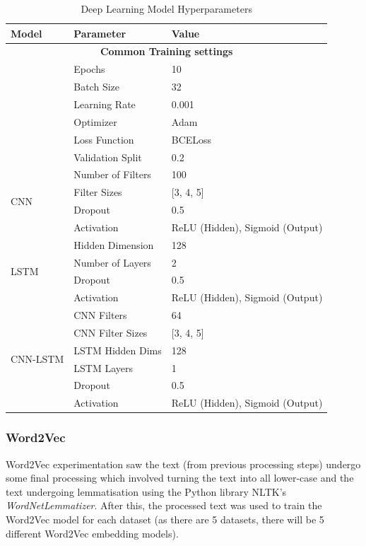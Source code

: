\documentclass[stu,12pt,floatsintext,donotrepeattitle]{apa7}
\begin{document}
\begin{table}[ht]
    \centering
    \caption{Deep Learning Model Hyperparameters}
    \label{tab:dl_model_params}
    \begin{tabular}{l l l}
        \hline
        \textbf{Model} & \textbf{Parameter} & \textbf{Value} \\
        \hline
        \multicolumn{3}{c}{\textbf{Common Training settings}} \\
        & Epochs & 10 \\
        & Batch Size & 32 \\
        & Learning Rate & 0.001 \\
        & Optimizer & Adam \\
        & Loss Function & BCELoss \\
        & Validation Split & 0.2 \\
        \hline
        \multirow{4}{*}{CNN} & Number of Filters & 100 \\
        & Filter Sizes & [3, 4, 5] \\
        & Dropout & 0.5 \\
        & Activation & ReLU (Hidden), Sigmoid (Output) \\
        \hline
        \multirow{4}{*}{LSTM} & Hidden Dimension & 128 \\
        & Number of Layers & 2 \\
        & Dropout & 0.5 \\
        & Activation & ReLU (Hidden), Sigmoid (Output) \\
        \hline
        \multirow{6}{*}{CNN-LSTM} & CNN Filters & 64 \\
        & CNN Filter Sizes & [3, 4, 5] \\
        & LSTM Hidden Dims & 128 \\
        & LSTM Layers & 1 \\
        & Dropout & 0.5 \\
        & Activation & ReLU (Hidden), Sigmoid (Output) \\
        \hline
    \end{tabular}
\end{table}

\subsubsection{Word2Vec}
Word2Vec experimentation saw the text (from previous processing steps) undergo some final processing which involved turning the text into all lower-case and the text undergoing lemmatisation using the Python library NLTK's \textit{WordNetLemmatizer}. After this, the processed text was used to train the Word2Vec model for each dataset (as there are 5 datasets, there will be 5 different Word2Vec embedding models).
\end{document}
